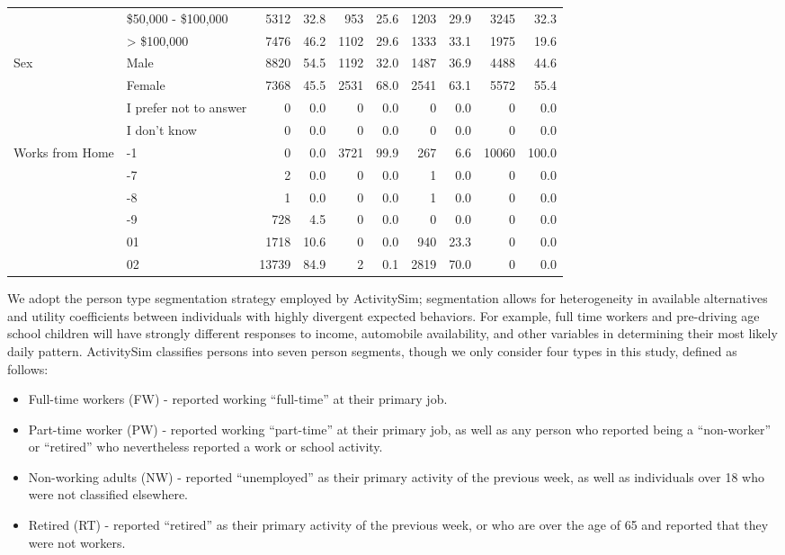 \documentclass[3p, authoryear, review]{elsarticle} %
\providecommand{\tightlist}{%
  \setlength{\itemsep}{0pt}\setlength{\parskip}{0pt}}
\begin{document}
\begin{landscape}
\begin{table}
{\begin{tabular}[t]{llrrrrrrrr}
 & \$50,000 - \$100,000 & 5312 & 32.8 & 953 & 25.6 & 1203 & 29.9 & 3245 & 32.3\\
 & > \$100,000 & 7476 & 46.2 & 1102 & 29.6 & 1333 & 33.1 & 1975 & 19.6\\
Sex & Male & 8820 & 54.5 & 1192 & 32.0 & 1487 & 36.9 & 4488 & 44.6\\
 & Female & 7368 & 45.5 & 2531 & 68.0 & 2541 & 63.1 & 5572 & 55.4\\
 & I prefer not to answer & 0 & 0.0 & 0 & 0.0 & 0 & 0.0 & 0 & 0.0\\
 & I don't know & 0 & 0.0 & 0 & 0.0 & 0 & 0.0 & 0 & 0.0\\
Works from Home & -1 & 0 & 0.0 & 3721 & 99.9 & 267 & 6.6 & 10060 & 100.0\\
 & -7 & 2 & 0.0 & 0 & 0.0 & 1 & 0.0 & 0 & 0.0\\
 & -8 & 1 & 0.0 & 0 & 0.0 & 1 & 0.0 & 0 & 0.0\\
 & -9 & 728 & 4.5 & 0 & 0.0 & 0 & 0.0 & 0 & 0.0\\
 & 01 & 1718 & 10.6 & 0 & 0.0 & 940 & 23.3 & 0 & 0.0\\
 & 02 & 13739 & 84.9 & 2 & 0.1 & 2819 & 70.0 & 0 & 0.0\\
\bottomrule
\end{tabular}}
\end{table}
\end{landscape}

We adopt the person type segmentation strategy employed by ActivitySim;
segmentation allows for heterogeneity in available alternatives and utility
coefficients between individuals with highly divergent expected behaviors. For
example, full time workers and pre-driving age school children will have
strongly different responses to income, automobile availability, and other
variables in determining their most likely daily pattern.
ActivitySim classifies persons into seven person segments, though we only
consider four types in this study, defined as follows:

\begin{itemize}
\tightlist
\item
  Full-time workers (FW) - reported working ``full-time'' at their primary job.
\item
  Part-time worker (PW) - reported working ``part-time'' at their primary job,
  as well as any person who reported being a ``non-worker'' or ``retired'' who nevertheless
  reported a work or school activity.
\item
  Non-working adults (NW) - reported ``unemployed'' as their primary activity
  of the previous week, as well as individuals over 18 who were not classified
  elsewhere.
\item
  Retired (RT) - reported ``retired'' as their primary activity of the previous
  week, or who are over the age of 65 and reported that they were not workers.
\end{itemize}
\end{document}
